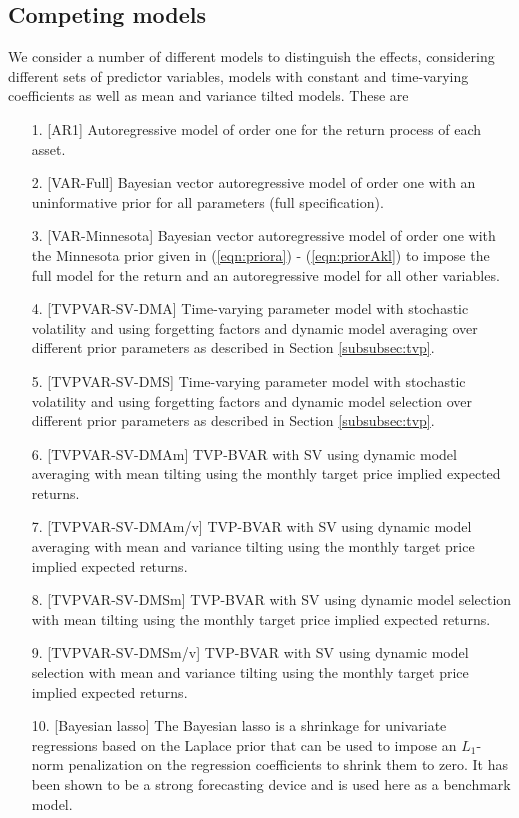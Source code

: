 \subsection{Competing models}
We consider a number of different models to distinguish the effects, considering different sets of predictor variables, models with constant and time-varying coefficients as well as mean and variance tilted models. These are
\begin{enumerate}
	\item[1.][AR1] Autoregressive model of order one for the return process of each asset.
	\item[2.][VAR-Full] Bayesian vector autoregressive model of order one with an uninformative prior for all parameters (full specification).
	\item[3.][VAR-Minnesota] Bayesian vector autoregressive model of order one with the Minnesota prior given in (\ref{eqn:priora}) - (\ref{eqn:priorAkl}) to impose the full model for the return and an autoregressive model for all other variables.
	\item[4.][TVPVAR-SV-DMA] Time-varying parameter model with stochastic volatility and using forgetting factors and dynamic model averaging over different prior parameters as described in Section \ref{subsubsec:tvp}.
	\item[5.][TVPVAR-SV-DMS] Time-varying parameter model with stochastic volatility and using forgetting factors and dynamic model selection over different prior parameters as described in Section \ref{subsubsec:tvp}.
	\item[6.][TVPVAR-SV-DMAm] TVP-BVAR with SV using dynamic model averaging with mean tilting using the monthly target price implied expected returns.
	\item[7.][TVPVAR-SV-DMAm/v] TVP-BVAR with SV using dynamic model averaging with mean and variance tilting using the monthly target price implied expected returns.
	\item[8.][TVPVAR-SV-DMSm] TVP-BVAR with SV using dynamic model selection with mean tilting using the monthly target price implied expected returns.
	\item[9.][TVPVAR-SV-DMSm/v] TVP-BVAR with SV using dynamic model selection with mean and variance tilting using the monthly  target price implied expected returns.
	\item[10.][Bayesian lasso] The Bayesian lasso \citep{park2008} is a shrinkage for univariate regressions based on the Laplace prior that can be used to impose an $L_1$-norm penalization on the regression coefficients to shrink them to zero. %
	It has been shown to be a strong forecasting device \citep{korobilis2013} and is used here as a benchmark model.
\end{enumerate}

